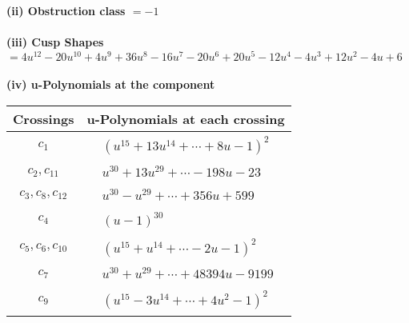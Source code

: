 \documentclass[1p]{elsarticle_modified}
\theoremstyle{definition}
\begin{document}
\flushleft \textbf{(ii) Obstruction class $= -1$}\\~\\
\flushleft \textbf{(iii) Cusp Shapes $= 4 u^{12}-20 u^{10}+4 u^9+36 u^8-16 u^7-20 u^6+20 u^5-12 u^4-4 u^3+12 u^2-4 u+6$}\\~\\
\newpage\renewcommand{\arraystretch}{1}
\flushleft \textbf{(iv) u-Polynomials at the component}\newline \\
\begin{tabular}{m{50pt}|m{274pt}}
Crossings & \hspace{64pt}u-Polynomials at each crossing \\
\hline $$\begin{aligned}c_{1}\end{aligned}$$&$\begin{aligned}
&(u^{15}+13 u^{14}+\cdots+8 u-1)^{2}
\end{aligned}$\\
\hline $$\begin{aligned}c_{2},c_{11}\end{aligned}$$&$\begin{aligned}
&u^{30}+13 u^{29}+\cdots-198 u-23
\end{aligned}$\\
\hline $$\begin{aligned}c_{3},c_{8},c_{12}\end{aligned}$$&$\begin{aligned}
&u^{30}- u^{29}+\cdots+356 u+599
\end{aligned}$\\
\hline $$\begin{aligned}c_{4}\end{aligned}$$&$\begin{aligned}
&(u-1)^{30}
\end{aligned}$\\
\hline $$\begin{aligned}c_{5},c_{6},c_{10}\end{aligned}$$&$\begin{aligned}
&(u^{15}+u^{14}+\cdots-2 u-1)^{2}
\end{aligned}$\\
\hline $$\begin{aligned}c_{7}\end{aligned}$$&$\begin{aligned}
&u^{30}+u^{29}+\cdots+48394 u-9199
\end{aligned}$\\
\hline $$\begin{aligned}c_{9}\end{aligned}$$&$\begin{aligned}
&(u^{15}-3 u^{14}+\cdots+4 u^2-1)^{2}
\end{aligned}$\\
\hline
\end{tabular}\\~\\
\end{document}
